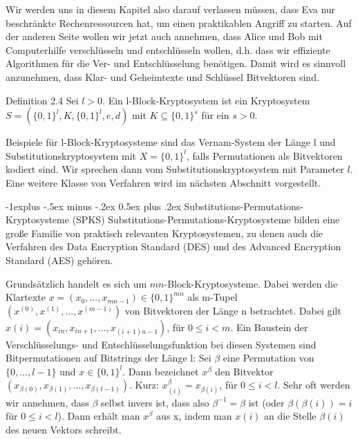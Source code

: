 \documentclass[a4paper]{article}
\makeatletter
\renewcommand{\subsection}{\@startsection{subsection}{2}{0mm}%
 {-1explus -.5ex minus -.2ex}%
 {0.5ex plus .2ex}%
 {\normalfont\normalsize\bfseries}}
\makeatother
\begin{document}
\begin{multicols}{3}
    Wir werden uns in diesem Kapitel also darauf verlassen müssen, dass Eva nur beschränkte Rechenressourcen hat, um einen praktikablen Angriff zu starten. Auf der anderen Seite wollen wir jetzt auch annehmen, dass Alice und Bob mit Computerhilfe verschlüsseln und entschlüsseln wollen, d.h. dass wir effiziente Algorithmen für die Ver- und Entschlüsselung benötigen. Damit wird es sinnvoll anzunehmen, dass Klar- und Geheimtexte und Schlüssel Bitvektoren sind.

    Definition 2.4 Sei $l>0$. Ein l-Block-Kryptosystem ist ein Kryptosystem $S=(\{0,1\}^l,K,\{0,1\}^l,e,d)$ mit $K\subseteq \{0,1\}^s$ für ein $s>0$.

    Beispiele für l-Block-Kryptosysteme sind das Vernam-System der Länge l und Substitutionskryptosystem mit $X=\{0,1\}^l$, falls Permutationen als Bitvektoren kodiert sind. Wir sprechen dann vom Substitutionskryptosystem mit Parameter $l$.
    Eine weitere Klasse von Verfahren wird im nächsten Abschnitt vorgestellt.

    \subsection{Substitutions-Permutations-Kryptosysteme (SPKS)}
    Substitutions-Permutations-Kryptosysteme bilden eine große Familie von praktisch relevanten Kryptosystemen, zu denen auch die Verfahren des Data Encryption Standard (DES) und des Advanced Encryption Standard (AES) gehören.

    Grundsätzlich handelt es sich um $mn$-Block-Kryptosysteme. Dabei werden die Klartexte $x=(x_0,...,x_{mn-1})\in\{ 0,1\}^{mn}$ als m-Tupel $(x^{(0)},x^{(1)},...,x^{(m-1)})$ von Bitvektoren der Länge n betrachtet. Dabei gilt $x(i)=(x_{in},x_{in+1},...,x_{(i+1)n-1})$, für $0\leq i<m$.
    Ein Baustein der Verschlüsselungs- und Entschlüsselungsfunktion bei diesen Systemen sind Bitpermutationen auf Bitstrings der Länge l: Sei $\beta$ eine Permutation von $\{0,...,l-1\}$ und $x\in\{0,1\}^l$. Dann bezeichnet $x^{\beta}$ den Bitvektor $(x_{{\beta}(0)},x_{{\beta}(1)},...,x_{{\beta}(l-1)})$. Kurz: $x^{\beta}_{(i)}=x_{{\beta}(i)}$, für $0\leq i<l$.
    Sehr oft werden wir annehmen, dass $\beta$ selbst invers ist, dass also ${\beta}^{-1}=\beta$ ist (oder ${\beta}({\beta}(i))=i$ für $0\leq i<l$). Dann erhält man $x^{\beta}$ aus x, indem man $x(i)$ an die Stelle ${\beta}(i)$ des neuen Vektors schreibt.


\end{multicols}
\end{document}

